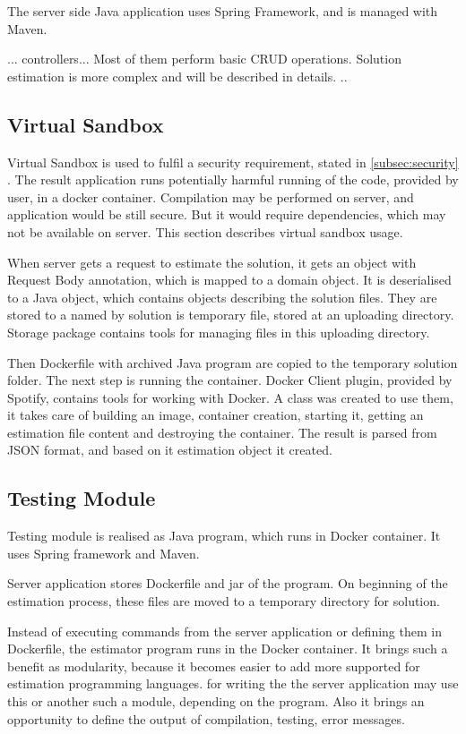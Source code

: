     The server side Java application uses Spring Framework, and is managed with Maven.
    
    ... controllers... Most of them perform basic CRUD operations. Solution estimation is more complex and will be described in details. ..
    
    
        \subsection{Virtual Sandbox}
        Virtual Sandbox is used to fulfil a security requirement, stated in \ref{subsec:security} . The result application runs potentially harmful running of the code, provided by user, in a docker container. Compilation may be performed on server, and application would be still secure. But it would require dependencies, which may not be available on server. This section describes virtual sandbox usage.
        
        When server gets a request to estimate the solution, it gets an object with Request Body annotation, which is mapped to a domain object. It is deserialised to a Java object, which contains objects describing the solution files. They are stored to a named by solution is temporary file, stored at an uploading directory. Storage package contains tools for managing files in this uploading directory.
        
        Then Dockerfile with archived Java program are copied to the temporary solution folder. The next step is running the container. Docker Client plugin, provided by Spotify, contains tools for working with Docker. A class was created to use them, it takes care of building an image, container creation, starting it, getting an estimation file content and destroying the container. The result is parsed from JSON format, and based on it estimation object it created.
        
        
        \subsection{Testing Module}
        Testing module is realised as Java program, which runs in Docker container. It uses Spring framework and Maven.
        
        Server application stores Dockerfile and jar of the program. On beginning of the estimation process, these files are moved to a temporary directory for solution. 
        
        Instead of executing commands from the server application or defining them in Dockerfile, the estimator program runs in the Docker container. It brings such a benefit as modularity, because it becomes easier to add more supported for estimation programming languages. 
        for writing the  the server application may use this or another such a module, depending on the program. Also it brings an opportunity to define the output of compilation, testing, error messages.
        

